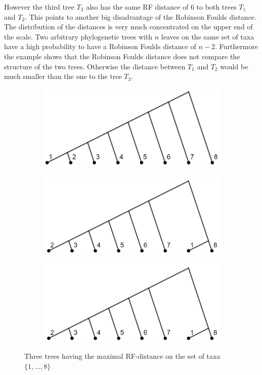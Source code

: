 However the third tree $T_3$ also has the same RF distance of $6$ to both trees $T_1$ and $T_2$. This points to another big disadvantage of the Robinson Foulds distance. The distribution of the distances is very much concentrated on the upper end of the scale. Two arbitrary phylogenetic trees with $n$ leaves on the same set of taxa have a high probability to have a Robinson Foulds distance of $n-2$. Furthermore the example shows that the Robinson Foulds distance does not compare the structure of the two trees. Otherwise the distance between $T_1$ and $T_2$ would be much smaller than the one to the tree $T_3$. 
\begin{figure}[ht!] \label{fig:maxRFdist}
    \begin{subfigure}[b]{0.45\textwidth}
        \includegraphics[width=\textwidth]{figures/RF_tree1.jpg}
    \end{subfigure}
    \quad
    \begin{subfigure}[b]{0.45\textwidth}
        \includegraphics[width=\textwidth]{figures/RF_tree2.jpg}
    \end{subfigure}
    \quad
    \begin{subfigure}[b]{0.45\textwidth}
        \includegraphics[width=\textwidth]{figures/RF_tree2.jpg}
    \end{subfigure}
    \caption{Three trees having the maximal RF-distance on the set of taxa $\{1,...,8\}$}
\end{figure}
 
